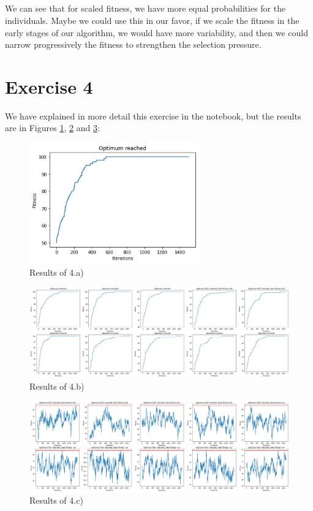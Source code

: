 \documentclass{scrartcl}
\begin{document}
\subsection{}
We can see that for scaled fitness, we have more equal probabilities for the individuals. Maybe we could use this in our favor, if we scale the fitness in the early stages of our algorithm, we would have more variability, and then we could narrow progressively the fitness to strengthen the selection pressure.


\section{Exercise 4}
We have explained in more detail this exercise in the notebook, but the results are in Figures \ref{a}, \ref{b} and \ref{c}:

\begin{figure}[h]
    \centering
    \includegraphics[width=0.65\textwidth]{8/output_a.png}
    \caption{Results of 4.a)}
    \label{a}
\end{figure}
\begin{figure}[h]
    \centering
    \includegraphics[width=\textwidth]{8/output_b.png}
    \caption{Results of 4.b)}
    \label{b}
\end{figure}  
\begin{figure}[h]
    \centering
    \includegraphics[width=\textwidth]{8/output_c.png}
    \caption{Results of 4.c)}
    \label{c}
    
\end{figure}
\end{document}
